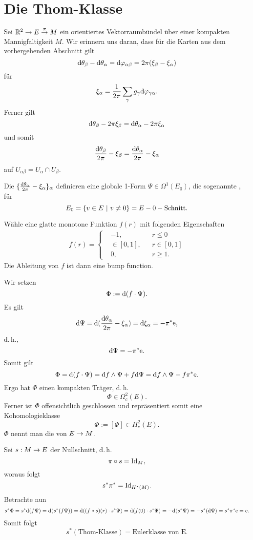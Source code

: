 
\section{Die Thom-Klasse}
\Def{}
Sei $\mathbb{R}^2 \overset{}{\rightarrow} E \overset{\pi}{\rightarrow} M$ ein orientiertes Vektorraumbündel über einer kompakten Mannigfaltigkeit $M$. Wir erinnern uns daran, dass für die Karten aus dem vorhergehenden Abschnitt gilt
\[ \text{d} \theta_\beta - \text{d} \theta_\alpha = \text{d} \varphi_{\alpha\beta} = 2\pi (\xi_\beta - \xi_\alpha) \]
für
\[ \xi_\alpha = \frac{1}{2 \pi} \sum_\gamma g_\gamma \text{d} \varphi_{\gamma\alpha}. \]
Ferner gilt
\[ \text{d} \theta_\beta - 2\pi \xi_\beta = \text{d} \theta_\alpha - 2\pi \xi_\alpha \]
und somit
\[ \frac{\text{d} \theta_\beta}{2 \pi} - \xi_\beta = \frac{\text{d} \theta_\alpha}{2\pi} - \xi_\alpha \]
auf $U_{\alpha \beta} = U_\alpha \cap U_\beta$.

Die $\{\frac{\text{d} \theta_\alpha}{2 \pi} - \xi_\alpha\}_\alpha$ definieren eine globale 1-Form $\Psi \in \Omega^1(E_0)$, die sogenannte , für
\[ E_0 = \set{v\in E}{v\neq 0} = E - \mathrm{0-Schnitt}. \]

Wähle eine glatte monotone Funktion $f(r)$ mit folgenden Eigenschaften
\begin{align*}
f(r) = \left\lbrace
\begin{aligned}
&-1, && r \leq 0\\
&\in [0,1], && r \in [0, 1]\\
&0, && r \geq 1.
\end{aligned}
\right.
\end{align*}
Die Ableitung von $f$ ist dann eine bump function.

Wir setzen
\[ \Phi := \text{d} (f \cdot \Psi). \]
Es gilt
\[ \text{d} \Psi = \text{d} (\frac{\text{d} \theta_\alpha}{2 \pi} - \xi_\alpha) = \text{d} \xi_\alpha = -\pi^* \mathrm{e}, \]
d.\,h.,
\[ \text{d} \Psi = -\pi^*\mathrm{e}. \]
Somit gilt
\[ \Phi = \text{d} (f \cdot \Psi) = \text{d} f \wedge \Psi + f \text{d} \Psi = \text{d} f \wedge \Psi - f \pi^*\mathrm{e}.  \]
Ergo hat $\Phi$ einen kompakten Träger, d.\,h.
\[ \Phi \in \Omega^2_c (E). \]
Ferner ist $\Phi$ offensichtlich geschlossen und repräsentiert somit eine Kohomologieklasse
\[ \Phi := [\Phi] \in H^2_c(E). \]
$\Phi$ nennt man die  von $E \overset{}{\rightarrow} M$.



Sei $s : M \overset{}{\rightarrow} E$ der Nullschnitt, d.\,h.
\[ \pi \circ s = \text{Id}_{M}, \]
woraus folgt
\[ s^* \pi^* = \text{Id}_{H^*(M)}. \]
Betrachte nun
\[ s^*\Phi = s^* \text{d} (f\Psi) = \text{d} (s^* (f\Psi)) = \text{d} ( (f\circ s)(r) \cdot s^*\Psi) = \text{d} (f(0) \cdot s^*\Psi ) = - \text{d} (s^* \Psi) = - s^*(\text{d} \Psi) = s^*\pi^* \mathrm{e} = \mathrm{e}. \]
Somit folgt
\[ s^*(\text{Thom-Klasse}) = \text{Eulerklasse von E}. \]

